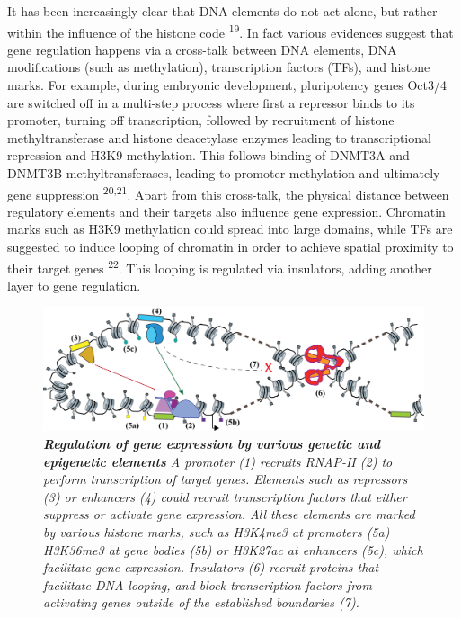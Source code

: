 \documentclass[11pt,twoside]{MPIthesis}
\theoremstyle{definition}
\theoremstyle{definition}
\theoremstyle{definition}
\theoremstyle{remark}
\begin{document}
It has been increasingly clear that DNA elements do not act alone, but
rather within the influence of the histone code \textsuperscript{19}. In
fact various evidences suggest that gene regulation happens via a
cross-talk between DNA elements, DNA modifications (such as
methylation), transcription factors (TFs), and histone marks. For
example, during embryonic development, pluripotency genes Oct3/4 are
switched off in a multi-step process where first a repressor binds to
its promoter, turning off transcription, followed by recruitment of
histone methyltransferase and histone deacetylase enzymes leading to
transcriptional repression and H3K9 methylation. This follows binding of
DNMT3A and DNMT3B methyltransferases, leading to promoter methylation
and ultimately gene suppression \textsuperscript{20,21}. Apart from this
cross-talk, the physical distance between regulatory elements and their
targets also influence gene expression. Chromatin marks such as H3K9
methylation could spread into large domains, while TFs are suggested to
induce looping of chromatin in order to achieve spatial proximity to
their target genes \textsuperscript{22}. This looping is regulated via
insulators, adding another layer to gene regulation.
\begin{figure}

{\centering \includegraphics[width=0.8\linewidth]{figures/intro_fig1} 

}

\caption[Regulation of gene expression by various genetic and epigenetic elements]{\emph{\textbf{Regulation of gene expression by various
genetic and epigenetic elements} A promoter (1) recruits RNAP-II (2) to
perform transcription of target genes. Elements such as repressors (3)
or enhancers (4) could recruit transcription factors that either
suppress or activate gene expression. All these elements are marked by
various histone marks, such as H3K4me3 at promoters (5a) H3K36me3 at
gene bodies (5b) or H3K27ac at enhancers (5c), which facilitate gene
expression. Insulators (6) recruit proteins that facilitate DNA looping,
and block transcription factors from activating genes outside of the
established boundaries (7).}}\label{fig:unnamed-chunk-1}
\end{figure}
\end{document}
